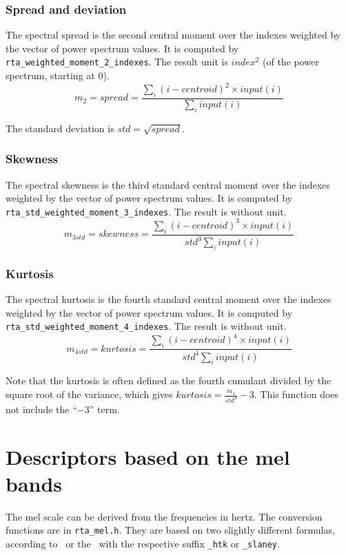 \documentclass[a4paper, twoside]{article}
\begin{document}
\subsubsection{Spread and deviation}
\label{sec:spread}

The spectral spread is the second central moment over the indexes
weighted by the vector of power spectrum values. It is computed by
\texttt{rta\_weighted\_moment\_2\_indexes}. The result unit is
$index^2$ (of the power spectrum, starting at 0).
$$ m_2 = spread = \frac {\sum_i (i - centroid )^2 \times input(i)}
{\sum_i input(i)} $$

The standard deviation is $std = \sqrt{spread}$.

\subsubsection{Skewness}
\label{sec:skewness}

The spectral skewness is the third standard central moment over the
indexes weighted by the vector of power spectrum values. It is
computed by \texttt{rta\_std\_weighted\_moment\_3\_indexes}. The
result is without unit.
$$ m_{3std} = skewness = \frac {\sum_i (i - centroid )^3 \times input(i)}
{std^3 \sum_i input(i)} $$

\subsubsection{Kurtosis}
\label{sec:kurtosis}

The spectral kurtosis is the fourth standard central moment over the
indexes weighted by the vector of power spectrum values. It is
computed by \texttt{rta\_std\_weighted\_moment\_4\_indexes}. The
result is without unit.
$$ m_{4std} = kurtosis = \frac {\sum_i (i - centroid )^4 \times input(i)}
{std^4 \sum_i input(i)} $$

Note that the kurtosis is often defined as the fourth cumulant divided
by the square root of the variance, which gives $kurtosis =
\frac{m_4}{std^4} - 3$.  This function does not include the ``$- 3$''
term.

\section{Descriptors based on the mel bands}
\label{sec:mel_descriptors}

The mel scale can be derived from the frequencies in hertz. The
conversion functions are in \texttt{rta\_mel.h}. They are based on two
slightly different formulas, according to \htk\ or the \atb\ with the
respective suffix \texttt{\_htk} or \texttt{\_slaney}.
\end{document}
